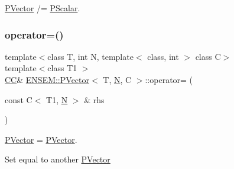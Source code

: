 \mbox{\hyperlink{classENSEM_1_1PVector}{P\+Vector}} /= \mbox{\hyperlink{classENSEM_1_1PScalar}{P\+Scalar}}. 

\mbox{\label{classENSEM_1_1PVector_a2917b5cc8ed23d68b4cc6f1cfb0f9172}} 
\subsubsection{\texorpdfstring{operator=()}{operator=()}\hspace{0.1cm}{\footnotesize\ttfamily [1/2]}}
{\footnotesize\ttfamily template$<$class T, int N, template$<$ class, int $>$ class C$>$ \\
template$<$class T1 $>$ \\
\mbox{\hyperlink{classENSEM_1_1PVector_a92dc0a0a301a3dc96f7be5d337019bc7}{CC}}\& \mbox{\hyperlink{classENSEM_1_1PVector}{E\+N\+S\+E\+M\+::\+P\+Vector}}$<$ T, \mbox{\hyperlink{operator__name__util_8cc_a7722c8ecbb62d99aee7ce68b1752f337}{N}}, C $>$\+::operator= (\begin{DoxyParamCaption}\item[{const C$<$ T1, \mbox{\hyperlink{operator__name__util_8cc_a7722c8ecbb62d99aee7ce68b1752f337}{N}} $>$ \&}]{rhs }\end{DoxyParamCaption})\hspace{0.3cm}{\ttfamily [inline]}}



\mbox{\hyperlink{classENSEM_1_1PVector}{P\+Vector}} = \mbox{\hyperlink{classENSEM_1_1PVector}{P\+Vector}}. 

Set equal to another \mbox{\hyperlink{classENSEM_1_1PVector}{P\+Vector}} \mbox{\label{classENSEM_1_1PVector_a2917b5cc8ed23d68b4cc6f1cfb0f9172}} 
